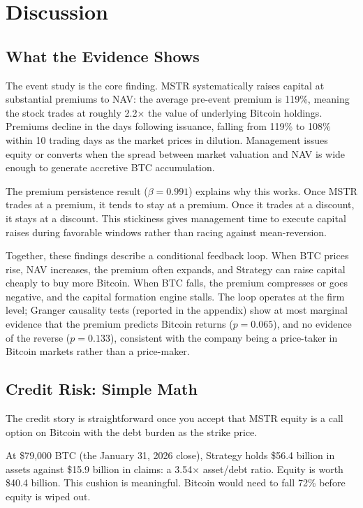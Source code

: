 \section{Discussion}
\label{sec:discussion}

\subsection{What the Evidence Shows}

The event study is the core finding. MSTR systematically raises capital at substantial premiums to NAV: the average pre-event premium is 119\%, meaning the stock trades at roughly 2.2$\times$ the value of underlying Bitcoin holdings. Premiums decline in the days following issuance, falling from 119\% to 108\% within 10 trading days as the market prices in dilution. Management issues equity or converts when the spread between market valuation and NAV is wide enough to generate accretive BTC accumulation.

The premium persistence result ($\beta = 0.991$) explains why this works. Once MSTR trades at a premium, it tends to stay at a premium. Once it trades at a discount, it stays at a discount. This stickiness gives management time to execute capital raises during favorable windows rather than racing against mean-reversion.

Together, these findings describe a conditional feedback loop. When BTC prices rise, NAV increases, the premium often expands, and Strategy can raise capital cheaply to buy more Bitcoin. When BTC falls, the premium compresses or goes negative, and the capital formation engine stalls. The loop operates at the firm level; Granger causality tests (reported in the appendix) show at most marginal evidence that the premium predicts Bitcoin returns ($p = 0.065$), and no evidence of the reverse ($p = 0.133$), consistent with the company being a price-taker in Bitcoin markets rather than a price-maker.

\subsection{Credit Risk: Simple Math}

The credit story is straightforward once you accept that MSTR equity is a call option on Bitcoin with the debt burden as the strike price.

At \$79,000 BTC (the January 31, 2026 close), Strategy holds \$56.4 billion in assets against \$15.9 billion in claims: a 3.54$\times$ asset/debt ratio. Equity is worth \$40.4 billion. This cushion is meaningful. Bitcoin would need to fall 72\% before equity is wiped out.

